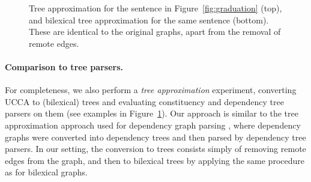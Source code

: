 \documentclass[11pt,a4paper]{article}
\newcommand{\figref}[1]{Figure~\ref{#1}}
\begin{document}
\begin{figure}
\centering
{}
  \caption{Tree approximation for the sentence in \figref{fig:graduation} (top),
  and bilexical tree approximation for the same sentence (bottom).
  These are identical to the original graphs,
  apart from the removal of remote edges.}
  \label{fig:tree_example}
\end{figure}

\paragraph{Comparison to tree parsers.}
For completeness,
we also perform a \textit{tree approximation} experiment, converting UCCA to (bilexical) trees
and evaluating constituency and dependency tree parsers on them
(see examples in \figref{fig:tree_example}).
Our approach is similar
to the tree approximation approach used for dependency graph parsing
\cite{agic2015semantic,fernandez2015parsing},
where dependency graphs were converted into dependency trees
and then parsed by dependency tree parsers.
In our setting, the conversion to trees consists simply of removing remote edges from the 
graph, and then to bilexical trees by applying the same procedure as for bilexical graphs.
\end{document}
